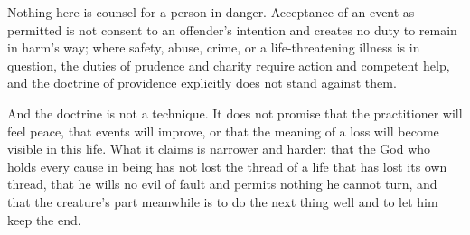 Nothing here is counsel for a person in danger. Acceptance of an event as permitted is not consent to an offender's intention and creates no duty to remain in harm's way; where safety, abuse, crime, or a life-threatening illness is in question, the duties of prudence and charity require action and competent help, and the doctrine of providence explicitly does not stand against them.

And the doctrine is not a technique. It does not promise that the practitioner will feel peace, that events will improve, or that the meaning of a loss will become visible in this life. What it claims is narrower and harder: that the God who holds every cause in being has not lost the thread of a life that has lost its own thread, that he wills no evil of fault and permits nothing he cannot turn, and that the creature's part meanwhile is to do the next thing well and to let him keep the end.
